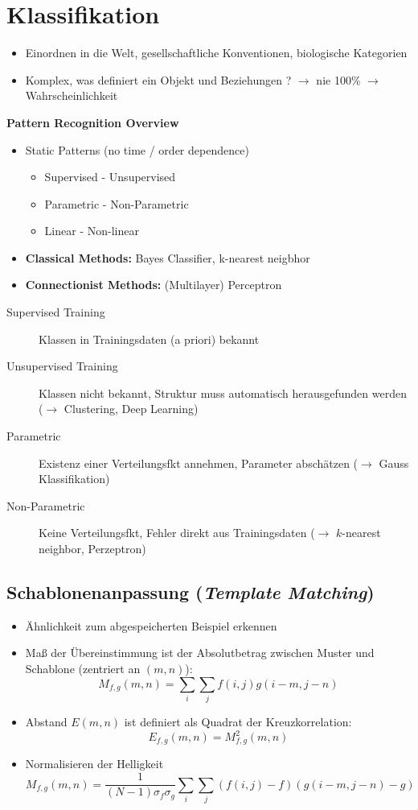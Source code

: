 
\chapter{Klassifikation}

\begin{itemize}
	\item Einordnen in die Welt, gesellschaftliche Konventionen, biologische Kategorien
	\item Komplex, was definiert ein Objekt und Beziehungen ? $\to$ nie 100\% $\to$ Wahrscheinlichkeit
\end{itemize}


\textbf{Pattern Recognition Overview}
\begin{itemize}
	\item Static Patterns (no time / order dependence)
	\begin{itemize}
		\item Supervised - Unsupervised
		\item Parametric - Non-Parametric
		\item Linear - Non-linear
	\end{itemize}
	\item \textbf{Classical Methods:} Bayes Classifier, k-nearest neigbhor
	\item \textbf{Connectionist Methods:} (Multilayer) Perceptron
\end{itemize}

\begin{description}
\item[Supervised Training] Klassen in Trainingsdaten (a priori) bekannt
\item[Unsupervised Training] Klassen nicht bekannt, Struktur  muss automatisch herausgefunden werden ($\to$ Clustering, Deep Learning)
\item[Parametric] Existenz einer Verteilungsfkt annehmen, Parameter abschätzen ($\to$ Gauss Klassifikation)
\item[Non-Parametric] Keine Verteilungsfkt, Fehler direkt aus Trainingsdaten ($\to$ $k$-nearest neighbor, Perzeptron)
\end{description}

\section{Schablonenanpassung (\textsl{Template Matching})}
\begin{itemize}
\item Ähnlichkeit zum abgespeicherten Beispiel erkennen
\item Maß der Übereinstimmung ist der Absolutbetrag zwischen Muster und Schablone (zentriert an $(m,n)$): $$M_{f,g}(m,n) = \sum\limits_i \sum\limits_j f(i,j) g(i-m,j-n)$$
\item Abstand $E(m,n)$ ist definiert als Quadrat der Kreuzkorrelation: $$E_{f,g} (m,n) = M_{f,g}^2(m,n)$$
\item Normalisieren der Helligkeit $$M_{f,g}(m,n) = \frac{1}{(N - 1) \sigma_f \sigma_g} \sum_i \sum_j (f(i,j) - \textit{\=f})(g(i-m, j-n) - \textit{\=g})$$
\end{itemize}


